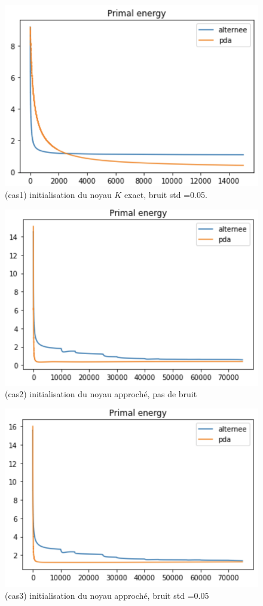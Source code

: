 \documentclass[a4paper]{article}
\begin{document}
\begin{figure}[h]
\includegraphics[scale=1.0]{figures/cas1}	
\caption{(cas1)  initialisation du noyau $K$ exact, bruit std =0.05.}
\end{figure}
%
\begin{figure}[h]
\includegraphics[scale=1.0]{figures/cas2}	
\caption{(cas2)  initialisation du noyau approché, pas de bruit}
\end{figure}
%
\begin{figure}[h]
\includegraphics[scale=1.0]{figures/cas3}	
\caption{(cas3) initialisation du noyau approché, bruit std =0.05}
\end{figure}
\end{document}
